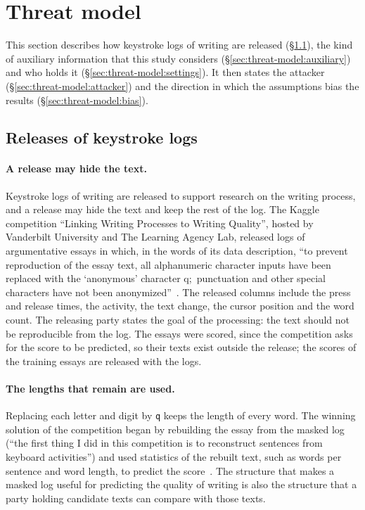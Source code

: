 \section{Threat model}
\label{sec:threat-model}

This section describes how keystroke logs of writing are released (\S\ref{sec:threat-model:releases}), the kind of
auxiliary information that this study considers (\S\ref{sec:threat-model:auxiliary}) and who holds it
(\S\ref{sec:threat-model:settings}). It then states the attacker (\S\ref{sec:threat-model:attacker}) and the direction
in which the assumptions bias the results (\S\ref{sec:threat-model:bias}).

\subsection{Releases of keystroke logs}
\label{sec:threat-model:releases}

\paragraph{A release may hide the text.}
Keystroke logs of writing are released to support research on the writing process, and a release may hide the text
and keep the rest of the log. The Kaggle competition ``Linking Writing Processes to Writing Quality'', hosted by Vanderbilt University and
The Learning Agency Lab, released logs of
argumentative essays in which, in the words of its data description, ``to prevent reproduction of the essay text, all
alphanumeric character inputs have been replaced with the `anonymous' character q;\ punctuation and other special
characters have not been anonymized''~\cite{kaggle2023lwp}. The released columns include the press and release times,
the activity, the text change, the cursor position and the word count. The releasing party states the goal of the
processing: the text should not be reproducible from the log. The essays were scored, since the competition asks for
the score to be predicted, so their texts exist outside the release; the scores of the training essays are released
with the logs.

\paragraph{The lengths that remain are used.}
Replacing each letter and digit by \texttt{q} keeps the length of every word. The winning solution of the competition
began by rebuilding the essay from the masked log (``the first thing I did in this competition is to reconstruct
sentences from keyboard activities'') and used statistics of the rebuilt text, such as words per sentence and word
length, to predict the score~\cite{inubushi2024first}. The structure that makes a masked log useful for predicting the
quality of writing is also the structure that a party holding candidate texts can compare with those texts.

